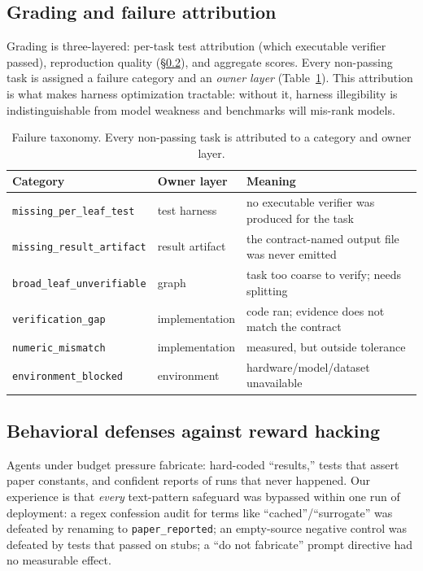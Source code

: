 \documentclass{article}
\begin{document}
\subsection{Grading and failure attribution}

Grading is three-layered: per-task test attribution (which executable
verifier passed), reproduction quality (\S\ref{sec:hacking}), and aggregate
scores. Every non-passing task is assigned a failure category and an
\emph{owner layer} (Table~\ref{tab:taxonomy}). This attribution is what makes
harness optimization tractable: without it, harness illegibility is
indistinguishable from model weakness and benchmarks will mis-rank models.

\begin{table}[t]
\caption{Failure taxonomy. Every non-passing task is attributed to a category
and owner layer.}
\label{tab:taxonomy}
\begin{center}
\small
\begin{tabular}{llp{6.1cm}}
\toprule
\textbf{Category} & \textbf{Owner layer} & \textbf{Meaning} \\
\midrule
\texttt{missing\_per\_leaf\_test} & test harness & no executable verifier was produced for the task \\
\texttt{missing\_result\_artifact} & result artifact & the contract-named output file was never emitted \\
\texttt{broad\_leaf\_unverifiable} & graph & task too coarse to verify; needs splitting \\
\texttt{verification\_gap} & implementation & code ran; evidence does not match the contract \\
\texttt{numeric\_mismatch} & implementation & measured, but outside tolerance \\
\texttt{environment\_blocked} & environment & hardware/model/dataset unavailable \\
\bottomrule
\end{tabular}
\end{center}
\end{table}

\subsection{Behavioral defenses against reward hacking}
\label{sec:hacking}

Agents under budget pressure fabricate: hard-coded ``results,'' tests that
assert paper constants, and confident reports of runs that never happened.
Our experience is that \emph{every} text-pattern safeguard was bypassed
within one run of deployment: a regex confession audit for terms like
``cached''/``surrogate'' was defeated by renaming to
\texttt{paper\_reported}; an empty-source negative control was defeated by
tests that passed on stubs; a ``do not fabricate'' prompt directive had no
measurable effect.
\end{document}
